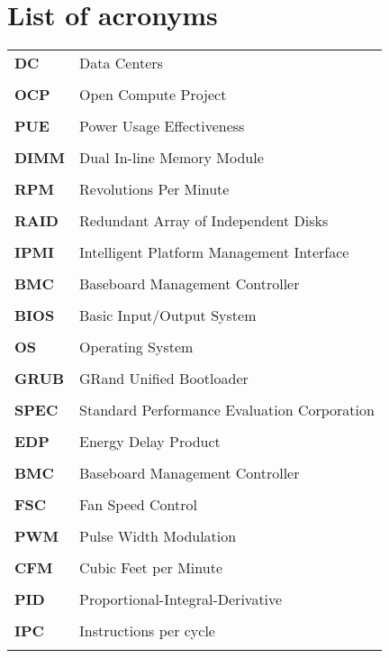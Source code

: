 \chapter{List of acronyms}
\begin{tabular}{ p{3cm} p{10cm}}
  \bf DC &  Data Centers \\ \\
  \bf OCP &  Open Compute Project \\ \\
  \bf PUE & Power Usage Effectiveness \\ \\
  \bf DIMM & Dual In-line Memory Module  \\ \\
  \bf RPM &  Revolutions Per Minute \\ \\
  \bf RAID & Redundant Array of Independent Disks  \\ \\
  \bf IPMI & Intelligent Platform Management Interface  \\ \\
  \bf BMC &  Baseboard Management Controller \\ \\
  \bf BIOS & Basic Input/Output System \\ \\
  \bf OS   & Operating System \\ \\
  \bf GRUB & GRand Unified Bootloader  \\ \\
  \bf SPEC & Standard Performance Evaluation Corporation  \\ \\
  \bf EDP &  Energy Delay Product \\ \\
  \bf BMC &  Baseboard Management Controller \\ \\
  \bf FSC &  Fan Speed Control \\ \\
  \bf PWM &  Pulse Width Modulation  \\ \\
  \bf CFM &  Cubic Feet per Minute \\ \\
  \bf PID &  Proportional-Integral-Derivative \\ \\
  \bf IPC &  Instructions per cycle  \\ \\

\end{tabular}

